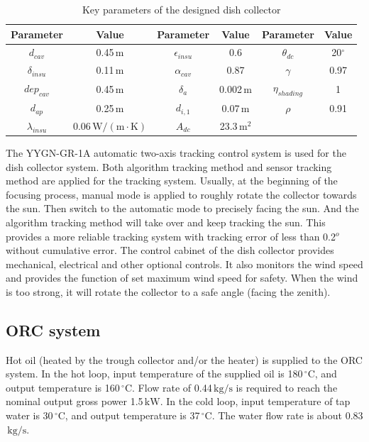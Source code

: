 \begin{table}[htbp]
	\caption{Key parameters of the designed dish collector}
	\begin{center}
	\begin{tabular}{cccccc}
		\toprule
		Parameter		&	Value	&	Parameter		&	Value	&	Parameter		&	Value\\
		\midrule
		$d_{cav}$	&	0.45$\,\mathrm{m}$	&	$\epsilon_{insu}$	&	0.6	&	$\theta_{dc}$	&	20$^\circ$\\
		$\delta_{insu}$	&	0.11$\,\mathrm{m}$	&	$\alpha_{cav}$	&	0.87	&	$\gamma$	&	0.97\\
		$dep_{cav}$	&	0.45$\,\mathrm{m}$	&	$\delta_a$		&	0.002$\,\mathrm{m}$	&	$\eta_{shading}$	&	1\\
		$d_{ap}$	&	0.25$\,\mathrm{m}$	&	$d_{i,1}$	&	0.07$\,\mathrm{m}$	&	$\rho$	&	0.91\\
		$\lambda_{insu}$	&	0.06$\,\mathrm{W/(m\cdot K)}$	&	$A_{dc}$	&	23.3$\,\mathrm{m^2}$	&	\\		
		\bottomrule
	\end{tabular}
	\end{center}
	\label{tab:ddc}
\end{table}

The YYGN-GR-1A automatic two-axis tracking control system is used for the dish collector system. Both algorithm tracking method and sensor tracking method are applied for the tracking system. Usually, at the beginning of the focusing process, manual mode is applied to roughly rotate the collector towards the sun. Then switch to the automatic mode to precisely facing the sun. And the algorithm tracking method will take over and keep tracking the sun. This provides a more reliable tracking system with tracking error of less than 0.2$^o$ without cumulative error.
The control cabinet of the dish collector provides mechanical, electrical and other optional controls. It also monitors the wind speed and provides the function of set maximum wind speed for safety. When the wind is too strong, it will rotate the collector to a safe angle (facing the zenith).

\subsection{ORC system}
Hot oil (heated by the trough collector and/or the heater) is supplied to the ORC system. 
In the hot loop, input temperature of the supplied oil is 180$\,^\circ$C, and output temperature is 160$\,^\circ$C. Flow rate of 0.44$\,\mathrm{kg/s}$ is required to reach the nominal output gross power 1.5$\,\mathrm{kW}$. In the cold loop, input temperature of tap water is 30$\,^\circ$C, and output temperature is 37$\,^\circ$C. The water flow rate is about 0.83$\,\mathrm{kg/s}$.

